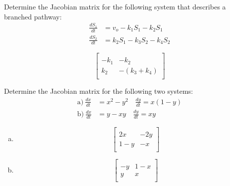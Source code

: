 \documentclass[12pt]{article}
\begin{document}
\begin{question}
Determine the Jacobian matrix for the following system that describes a branched pathway:
%
\begin{align*}
\frac{dS_1}{dt} &= v_o - k_1 S_1 - k_2 S_1 \\[5pt]
\frac{dS_2}{dt} &= k_2 S_1 - k_3 S_2 - k_4 S_2
\end{align*}
\end{question}
\begin{solution}
$$
\begin{bmatrix}\\[-8pt]
-k_1 & -k_2 \\[7pt]
k_2 & -(k_3 + k_4) \\[7pt]
\end{bmatrix}
$$
\end{solution}


\begin{question}
Determine the Jacobian matrix for the following two systems:
%
\begin{align*}
\text{a)}\ \frac{dx}{dt} &= x^2 - y^2 \quad \frac{dy}{dt} = x (1 - y) \\[10pt]
\text{b)}\ \frac{dx}{dt} &= y - x y \quad \frac{dy}{dt} = x y
\end{align*}
\end{question}
\begin{solution}
\begin{enumerate}[a)]
\item
$$
\begin{bmatrix}\\[-8pt]
2x & -2y \\[7pt]
1-y & -x \\[7pt]
\end{bmatrix}
$$
\item
$$
\begin{bmatrix}\\[-8pt]
-y & 1-x \\[7pt]
y & x \\[7pt]
\end{bmatrix}
$$
\end{enumerate}
\end{solution}
\end{document}
